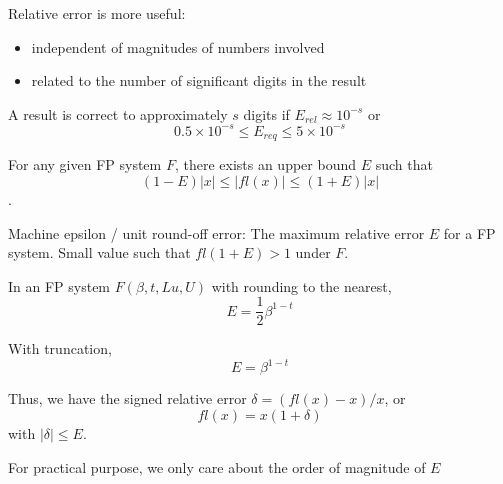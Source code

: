 \documentclass[12pt]{article}
\begin{document}
Relative error is more useful: 
\begin{itemize}
\item independent of magnitudes of numbers involved
\item related to the number of significant digits in the result
\end{itemize}

A result is correct to approximately $s$ digits if $E_{rel} \approx 10^{-s}$ or $$0.5 \times 10^{-s} \leq E_{req} \le 5 \times 10^{-s}$$

For any given FP system $F$, there exists an upper bound $E$ such that 
$$(1-E)|x| \leq |fl(x) | \leq (1+E) |x|$$. 

Machine epsilon / unit round-off error: The maximum relative error $E$ for a FP system. Small value such that $fl (1+E) > 1$ under $F$. 

In an FP system $F(\beta, t, Lu, U)$ with rounding to the nearest, $$E = \frac{1}{2} \beta^{1-t}$$

With truncation, 
$$E = \beta^{1-t}$$

Thus, we have the signed relative error $\delta = (fl(x) - x) / x$, or $$fl(x) = x (1+\delta)$$ with $|\delta| \leq E$. 

For practical purpose, we only care about the order of magnitude of $E$ 
\end{document}
